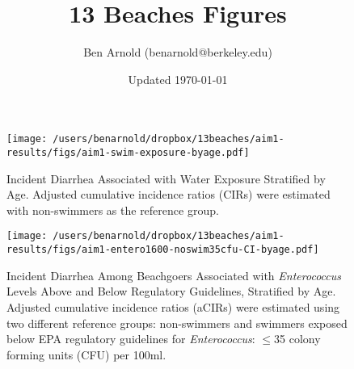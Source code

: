 \documentclass[11pt]{article}
\title{13 Beaches Figures}
\author{Ben Arnold (benarnold@berkeley.edu)}
\date{Updated \today}
\begin{document}
\begin{landscape}
\begin{figure}[htbp]
\begin{center}
\texttt{[image: /users/benarnold/dropbox/13beaches/aim1-results/figs/aim1-swim-exposure-byage.pdf]}
\begin{minipage}{1.2\textwidth}
\caption{Incident Diarrhea Associated with Water Exposure Stratified by Age. Adjusted cumulative incidence ratios (CIRs) were estimated with non-swimmers as the reference group.}
\label{fig:swimex}
\end{minipage}
\end{center}
\end{figure}
\end{landscape}

\begin{landscape}
\begin{figure}[htbp]
\begin{center}
\texttt{[image: /users/benarnold/dropbox/13beaches/aim1-results/figs/aim1-entero1600-noswim35cfu-CI-byage.pdf]} \\
\begin{minipage}{1.2\textwidth}
\caption{Incident Diarrhea Among Beachgoers Associated with \textit{Enterococcus} Levels Above and Below Regulatory Guidelines, Stratified by Age. Adjusted cumulative incidence ratios (aCIRs) were estimated using two different reference groups: non-swimmers and swimmers exposed below EPA regulatory guidelines for \textit{Enterococcus}: $\leq$35 colony forming units (CFU) per 100ml. }
\label{fig:enteroregulatory}
\end{minipage}
\end{center}
\end{figure}
\end{landscape}
\end{document}
